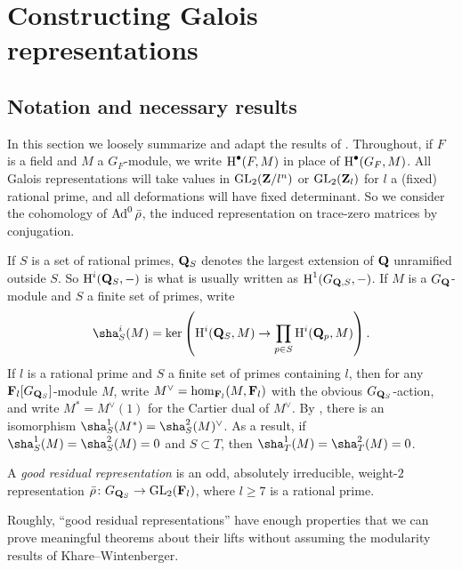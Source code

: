
\chapter{Constructing Galois representations}\label{ch:construct-Galois}





\section{Notation and necessary results}

In this section we loosely summarize and adapt the results of 
\cite{khare-larsen-ramakrishna-2005,pande-2011}. Throughout, if $F$ is a field 
and $M$ a $G_F$-module, we write $\operatorname{H}^\bullet(F,M)$ in place of 
$\operatorname{H}^\bullet(G_F,M)$. All Galois representations will take values in 
$\operatorname{GL}_2(\mathbf{Z}/l^n)$ or $\operatorname{GL}_2(\mathbf{Z}_l)$ for $l$ a (fixed) rational prime, and 
all deformations will have fixed determinant. So we consider the cohomology of 
$\operatorname{Ad}^0\bar\rho$, the induced representation on trace-zero matrices by 
conjugation. 

If $S$ is a set of rational primes, $\mathbf{Q}_S$ denotes the largest extension of 
$\mathbf{Q}$ unramified outside $S$. So $\operatorname{H}^i(\mathbf{Q}_S,-)$ is what is usually written as 
$\operatorname{H}^1(G_{\mathbf{Q},S},-)$. If $M$ is a $G_{\mathbf{Q}}$-module and $S$ a finite set of primes, 
write 
\[
	\sha^i_S(M) = \ker\left( \h^i(\bQ_S,M) \to \prod_{p\in S} \h^i(\bQ_p,M)\right) .
\]
If $l$ is a rational prime and $S$ a finite set of primes containing $l$, then 
for any $\mathbf{F}_l[G_{\mathbf{Q}_S}]$-module $M$, write $M^\vee=\hom_{\mathbf{F}_l}(M,\mathbf{F}_l)$ 
with the obvious $G_{\mathbf{Q}_S}$-action, and write $M^\ast = M^\vee(1)$ for the 
Cartier dual of $M^\vee$. By \cite[Th.~8.6.7]{neukirch-schmidt-winberg-2008}, 
there is an isomorphism $\sha^1_S(M^\ast) = \sha_S^2(M)^\vee$. As a result, if 
$\sha_S^1(M) = \sha_S^2(M) = 0$ and $S\subset T$, then 
$\sha_T^1(M) = \sha_T^2(M) = 0$. 

\begin{definition}
A \emph{good residual representation} is an odd, absolutely irreducible, 
weight-$2$ representation $\bar\rho\colon G_{\mathbf{Q}_S} \to \operatorname{GL}_2(\mathbf{F}_l)$, where 
$l\geqslant 7$ is a rational prime. 
\end{definition}

Roughly, ``good residual representations'' have enough properties that we can 
prove meaningful theorems about their lifts without assuming the modularity 
results of Khare--Wintenberger. 

